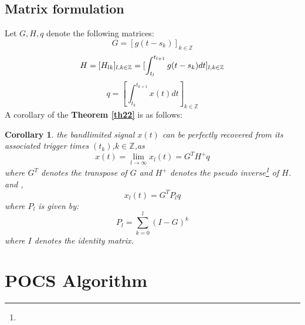 \documentclass{article}
\newtheorem{corollary}{Corollary}[section]
\begin{document}
\subsection{Matrix formulation}
Let $G,H,q$ denote the following matrices:
\begin{equation*}
    G = [g(t-s_k)]_{k\in\mathbb{Z}} 
\end{equation*}
\begin{equation*}
    H = [H_{lk}]_{l,k\in\mathbb{Z}} = [\int_{t_l}^{t_{l+1}}g(t-s_k)dt]_{l,k\in\mathbb{Z}} \\ 
\end{equation*}
\begin{equation*}   
    q = [\int_{t_k}^{t_{k+1}}x(t)dt]_{k\in\mathbb{Z}}
\end{equation*}
A corollary of the \textbf{Theorem \ref{th22}} is as follows:\\
\begin{corollary}
the bandlimited signal $x(t)$ can be perfectly recovered from its associated trigger times $(t_k)$,$k\in\mathbb{Z}$,as\\
\begin{equation}
    x(t) = \lim_{l\to\infty}x_l(t) = G^TH^+q
\end{equation}
where $G^T$ denotes the transpose of $G$ and $H^+$ denotes the pseudo inverse\footnote{} of $H$.
and ,\\
\begin{equation*}
    x_l(t) = G^TP_lq
\end{equation*}
where $P_l$ is given by:\\
\begin{equation*}
    P_l = \sum_{k=0}^l(I-G)^k
\end{equation*}
where $I$ denotes the identity matrix.
\end{corollary}

\section{POCS Algorithm}
\end{document}
